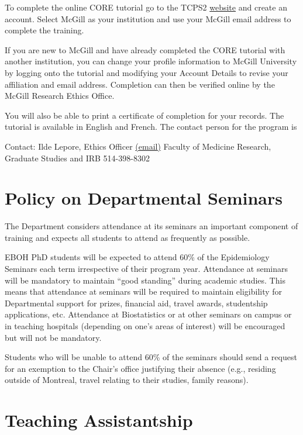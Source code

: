 \documentclass[
  letterpaper,
  DIV=11,
  numbers=noendperiod]{scrreprt}
\begin{document}
To complete the online CORE tutorial go to the TCPS2
\href{http://tcps2core.ca/welcome}{website} and create an account.
Select McGill as your institution and use your McGill email address to
complete the training.

If you are new to McGill and have already completed the CORE tutorial
with another institution, you can change your profile information to
McGill University by logging onto the tutorial and modifying your
Account Details to revise your affiliation and email address. Completion
can then be verified online by the McGill Research Ethics Office.

You will also be able to print a certificate of completion for your
records. The tutorial is available in English and French. The contact
person for the program is

Contact: Ilde Lepore, Ethics Officer
\href{mailto:ilde.lepore@mcgill.ca}{(email)} Faculty of Medicine
Research, Graduate Studies and IRB 514-398-8302

\section{Policy on Departmental
Seminars}\label{policy-on-departmental-seminars}

The Department considers attendance at its seminars an important
component of training and expects all students to attend as frequently
as possible.

EBOH PhD students will be expected to attend 60\% of the Epidemiology
Seminars each term irrespective of their program year. Attendance at
seminars will be mandatory to maintain ``good standing'' during academic
studies. This means that attendance at seminars will be required to
maintain eligibility for Departmental support for prizes, financial aid,
travel awards, studentship applications, etc. Attendance at
Biostatistics or at other seminars on campus or in teaching hospitals
(depending on one's areas of interest) will be encouraged but will not
be mandatory.

Students who will be unable to attend 60\% of the seminars should send a
request for an exemption to the Chair's office justifying their absence
(e.g., residing outside of Montreal, travel relating to their studies,
family reasons).

\section{Teaching Assistantship}\label{teaching-assistantship}
\end{document}
